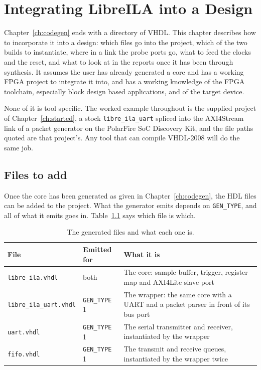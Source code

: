 \documentclass[../manual.tex]{subfiles}
\begin{document}
\chapter{Integrating LibreILA into a Design}
\label{ch:integration}

Chapter~\ref{ch:codegen} ends with a directory of VHDL. This chapter describes how to incorporate it into a design: which files go into the project, which of the two builds to instantiate, where in a link the probe ports go, what to feed the clocks and the reset, and what to look at in the reports once it has been through synthesis. It assumes the user has already generated a core and has a working FPGA project to integrate it into, and has a working knowledge of the FPGA toolchain, especially block design based applications, and of the target device.

None of it is tool specific. The worked example throughout is the supplied project of Chapter~\ref{ch:started}, a stock \texttt{libre\_ila\_uart} spliced into the AXI4Stream link of a packet generator on the PolarFire SoC Discovery Kit, and the file paths quoted are that project's. Any tool that can compile VHDL-2008 will do the same job.

\section{Files to add}
\label{sec:integ_files}

Once the core has been generated as given in Chapter~\ref{ch:codegen}, the HDL files can be added to the project. What the generator emits depends on \texttt{GEN\_TYPE}, and all of what it emits goes in. Table~\ref{tab:integ_files} says which file is which.

\begin{table}[H]
    \centering
    \begin{tabularx}{\textwidth}{|l|l|X|}
        \hline
        \rowcolor{gray!40} \textbf{File} & \textbf{Emitted for} & \textbf{What it is} \\
        \hline
        \texttt{libre\_ila.vhdl} & both & The core: sample buffer, trigger, register map and AXI4Lite slave port \\
        \hline
        \texttt{libre\_ila\_uart.vhdl} & \texttt{GEN\_TYPE} 1 & The wrapper: the same core with a UART and a packet parser in front of its bus port \\
        \hline
        \texttt{uart.vhdl} & \texttt{GEN\_TYPE} 1 & The serial transmitter and receiver, instantiated by the wrapper \\
        \hline
        \texttt{fifo.vhdl} & \texttt{GEN\_TYPE} 1 & The transmit and receive queues, instantiated by the wrapper twice \\
        \hline
    \end{tabularx}
    \caption{The generated files and what each one is.}
    \label{tab:integ_files}
\end{table}
\end{document}
